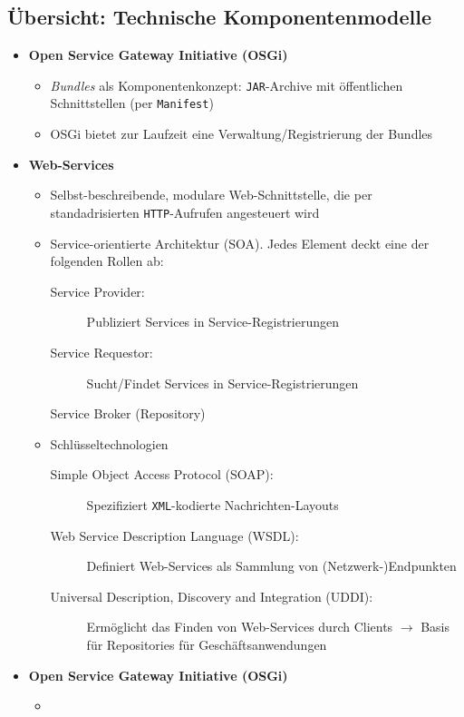 \subsection{Übersicht: Technische Komponentenmodelle}
\begin{itemize}
	\item \textbf{Open Service Gateway Initiative (OSGi)}
	\begin{itemize}
		\item \textit{Bundles} als Komponentenkonzept: \texttt{JAR}-Archive mit öffentlichen Schnittstellen (per \texttt{Manifest})
		\item OSGi bietet zur Laufzeit eine Verwaltung/Registrierung der Bundles
	\end{itemize}
	\item \textbf{Web-Services}
	\begin{itemize}
		\item Selbst-beschreibende, modulare Web-Schnittstelle, die per standadrisierten \texttt{HTTP}-Aufrufen angesteuert wird
		\item Service-orientierte Architektur (SOA). Jedes Element deckt eine der folgenden Rollen ab:
		\begin{description}
			\item[Service Provider:] Publiziert Services in Service-Registrierungen
			\item[Service Requestor:] Sucht/Findet Services in Service-Registrierungen
			\item[Service Broker (Repository)] 
		\end{description}
		\item Schlüsseltechnologien
		\begin{description}
			\item[Simple Object Access Protocol (SOAP):] Spezifiziert \texttt{XML}-kodierte Nachrichten-Layouts
			\item[Web Service Description Language (WSDL):] Definiert Web-Services als Sammlung von (Netzwerk-)Endpunkten
			\item[Universal Description, Discovery and Integration (UDDI):] Ermöglicht das Finden von Web-Services durch Clients \(\rightarrow\) Basis für Repositories für Geschäftsanwendungen
		\end{description}
	\end{itemize}
	\item \textbf{Open Service Gateway Initiative (OSGi)}
	\begin{itemize}
		\item
	\end{itemize}
\end{itemize}


